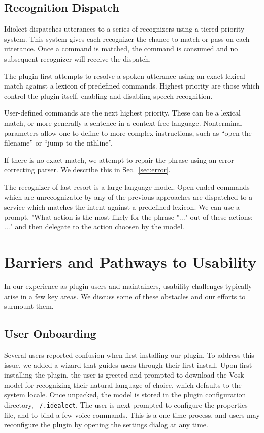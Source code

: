 \documentclass[conference]{IEEEtran}
\begin{document}
\subsection{Recognition Dispatch}

Idiolect dispatches utterances to a series of recognizers using a tiered priority system. This system gives each recognizer the chance to match or pass on each utterance. Once a command is matched, the command is consumed and no subsequent recognizer will receive the dispatch.

The plugin first attempts to resolve a spoken utterance using an exact lexical match against a lexicon of predefined commands. Highest priority are those which control the plugin itself, enabling and disabling speech recognition.

User-defined commands are the next highest priority. These can be a lexical match, or more generally a sentence in a context-free language. Nonterminal parameters allow one to define to more complex instructions, such as ``open the \textlangle filename'' or ``jump to the \textlangle nth\textrangle line''.

If there is no exact match, we attempt to repair the phrase using an error-correcting parser. We describe this in Sec.~\ref{sec:error}.

The recognizer of last resort is a large language model. Open ended commands which are unrecognizable by any of the previous approaches are dispatched to a service which matches the intent against a predefined lexicon. We can use a prompt, "What action is the most likely for the phrase "..." out of these actions: ..." and then delegate to the action choosen by the model.

\section{Barriers and Pathways to Usability}\label{sec:usability}

In our experience as plugin users and maintainers, usability challenges typically arise in a few key areas. We discuss some of these obstacles and our efforts to surmount them.

\subsection{User Onboarding}

Several users reported confusion when first installing our plugin. To address this issue, we added a wizard that guides users through their first install. Upon first installing the plugin, the user is greeted and prompted to download the Vosk model for recognizing their natural language of choice, which defaults to the system locale. Once unpacked, the model is stored in the plugin configuration directory, \texttt{~/.idealect}. The user is next prompted to configure the properties file, and to bind a few voice commands. This is a one-time process, and users may reconfigure the plugin by opening the settings dialog at any time.
\end{document}
